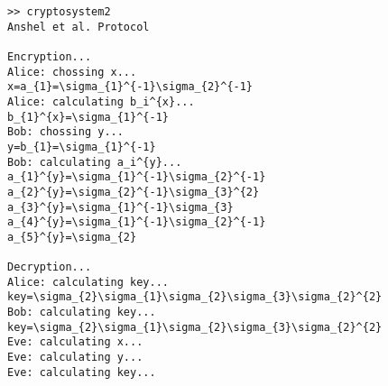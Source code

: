 \begin{lstlisting}
>> cryptosystem2
Anshel et al. Protocol
 
Encryption...
Alice: chossing x...
x=a_{1}=\sigma_{1}^{-1}\sigma_{2}^{-1}
Alice: calculating b_i^{x}...
b_{1}^{x}=\sigma_{1}^{-1}
Bob: chossing y...
y=b_{1}=\sigma_{1}^{-1}
Bob: calculating a_i^{y}...
a_{1}^{y}=\sigma_{1}^{-1}\sigma_{2}^{-1}
a_{2}^{y}=\sigma_{2}^{-1}\sigma_{3}^{2}
a_{3}^{y}=\sigma_{1}^{-1}\sigma_{3}
a_{4}^{y}=\sigma_{1}^{-1}\sigma_{2}^{-1}
a_{5}^{y}=\sigma_{2}
 
Decryption...
Alice: calculating key...
key=\sigma_{2}\sigma_{1}\sigma_{2}\sigma_{3}\sigma_{2}^{2}
Bob: calculating key...
key=\sigma_{2}\sigma_{1}\sigma_{2}\sigma_{3}\sigma_{2}^{2}
Eve: calculating x...
Eve: calculating y...
Eve: calculating key...
\end{lstlisting}
%
